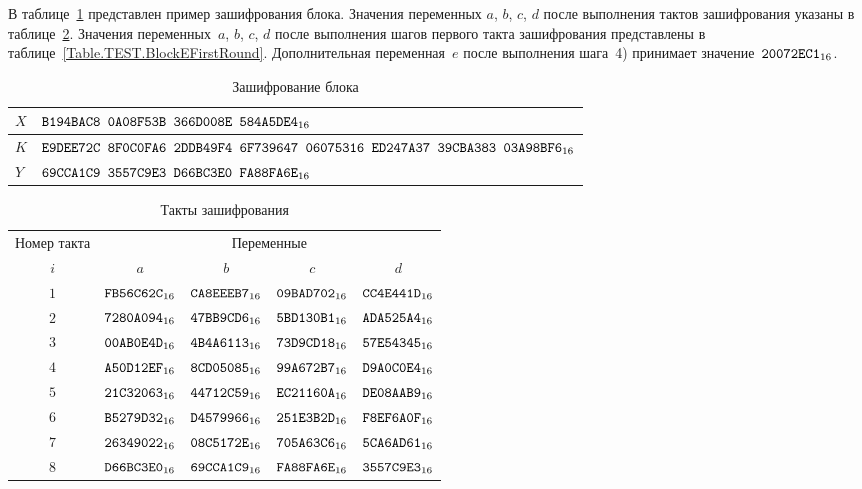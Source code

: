 \label{TEST.Block}

В таблице~\ref{Table.TEST.BlockE} представлен пример зашифрования блока.
%
Значения переменных $a$, $b$, $c$, $d$ после выполнения тактов
зашифрования указаны в таблице~\ref{Table.TEST.BlockERounds}.
%
Значения переменных~$a$, $b$, $c$, $d$ после выполнения шагов 
первого такта зашифрования представлены 
в таблице~\ref{Table.TEST.BlockEFirstRound}. 
Дополнительная переменная~$e$ после выполнения шага~4) 
принимает значение~$\texttt{20072EC1}_{16}$.

\begin{table}[H]
\caption{Зашифрование блока}\label{Table.TEST.BlockE}
\begin{tabular}{|l|l|}
\hline
$X$ &
$\texttt{B194BAC8~0A08F53B~366D008E~584A5DE4}_{16}$\\
\hline
$K$ & 
$\texttt{E9DEE72C~8F0C0FA6~2DDB49F4~6F739647~06075316~ED247A37~39CBA383~03A98BF6}_{16}$\\
\dhline
$Y$ &
$\texttt{69CCA1C9~3557C9E3~D66BC3E0~FA88FA6E}_{16}$\\
\hline
\end{tabular}
\end{table}

\begin{table}[H]
\caption{Такты зашифрования}\label{Table.TEST.BlockERounds}
\begin{tabular}{|c|c|c|c|c|}
\hline
Номер такта  & \multicolumn{4}{|c|}{Переменные}\\
 \cline{2-5}
$i$  &$a$&$b$&$c$&$d$ \\
\hline
\hline
$1$&$\texttt{FB56C62C}_{16}$&$\texttt{CA8EEEB7}_{16}$&$\texttt{09BAD702}_{16}$&$\texttt{CC4E441D}_{16}$\\
\hline                                                       
$2$&$\texttt{7280A094}_{16}$&$\texttt{47BB9CD6}_{16}$&$\texttt{5BD130B1}_{16}$&$\texttt{ADA525A4}_{16}$\\
\hline                                                       
$3$&$\texttt{00AB0E4D}_{16}$&$\texttt{4B4A6113}_{16}$&$\texttt{73D9CD18}_{16}$&$\texttt{57E54345}_{16}$\\
\hline                                                       
$4$&$\texttt{A50D12EF}_{16}$&$\texttt{8CD05085}_{16}$&$\texttt{99A672B7}_{16}$&$\texttt{D9A0C0E4}_{16}$\\
\hline                                                       
$5$&$\texttt{21C32063}_{16}$&$\texttt{44712C59}_{16}$&$\texttt{EC21160A}_{16}$&$\texttt{DE08AAB9}_{16}$\\
\hline                                                       
$6$&$\texttt{B5279D32}_{16}$&$\texttt{D4579966}_{16}$&$\texttt{251E3B2D}_{16}$&$\texttt{F8EF6A0F}_{16}$\\
\hline                                                       
$7$&$\texttt{26349022}_{16}$&$\texttt{08C5172E}_{16}$&$\texttt{705A63C6}_{16}$&$\texttt{5CA6AD61}_{16}$\\
\hline                                                       
$8$&$\texttt{D66BC3E0}_{16}$&$\texttt{69CCA1C9}_{16}$&$\texttt{FA88FA6E}_{16}$&$\texttt{3557C9E3}_{16}$\\
\hline
\end{tabular}
\end{table}

